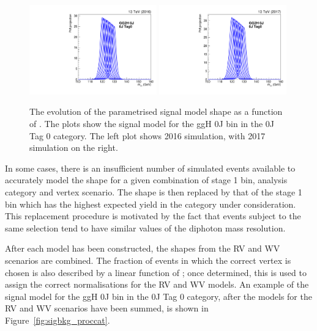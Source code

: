\begin{figure}[hptb]
  \centering
  \includegraphics[width=0.49\textwidth]{Figures/SigBkg/GG2H_0J_RECO_0J_Tag0_interp_2016.pdf}
  \includegraphics[width=0.49\textwidth]{Figures/SigBkg/GG2H_0J_RECO_0J_Tag0_interp_2017.pdf}
  \caption[Parametric signal model as a function of \mH.]
  {
    The evolution of the parametrised signal model shape as a function of \mH.
    The plots show the signal model for the ggH 0J bin in the 0J Tag 0 category.
    The left plot shows 2016 simulation, with 2017 simulation on the right.
  }
  \label{fig:sigbkg_interp}
\end{figure}

In some cases, there is an insufficient number of simulated events available 
to accurately model the shape for a given combination of stage 1 bin, 
analysis category and vertex scenario. %
The shape is then replaced by that of the stage 1 bin 
which has the highest expected yield in the category under consideration.
This replacement procedure is motivated by the fact that events subject to the same selection
tend to have similar values of the diphoton mass resolution.

After each model has been constructed, the shapes from the RV and WV scenarios are combined.
The fraction of events in which the correct vertex is chosen 
is also described by a linear function of \mH; 
once determined, this is used to assign the correct normalisations for the RV and WV models.
An example of the signal model for the ggH 0J bin in the 0J Tag 0 category, 
after the models for the RV and WV scenarios have been summed,
is shown in Figure~\ref{fig:sigbkg_proccat}.

